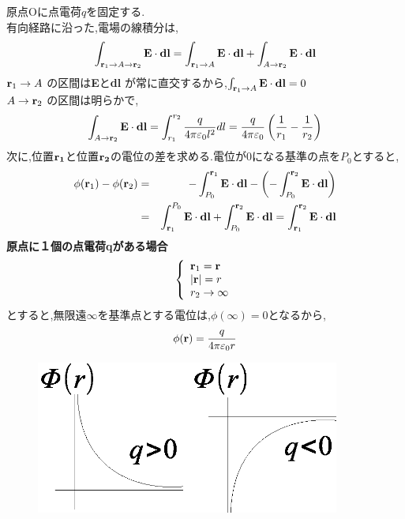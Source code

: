 \documentclass{jsarticle}
\begin{document}
原点Oに点電荷$q$を固定する. \\
有向経路に沿った,電場の線積分は,
\begin{eqnarray}
\int_{{\bf r}_1 \to A \to {\bf r}_2}^{} {\bf E} \cdot {\bf dl} = \int_{{\bf r}_1 \to A}^{} {\bf E} \cdot {\bf dl} + \int_{A \to {\bf r}_2}^{} {\bf E} \cdot {\bf dl}
\end{eqnarray}
${\bf r}_1 \to A$ の区間は{\bf E}と{\bf dl} が常に直交するから,$\int_{{\bf r}_1 \to A}^{} {\bf E} \cdot {\bf dl} = 0$ \\
$A \to {\bf r}_2$ の区間は明らかで,
\begin{eqnarray}
\int_{A \to {\bf r}_2}^{} {\bf E} \cdot {\bf dl} = \int_{r_1}^{r_2} \frac{q}{4 \pi \varepsilon_0 l^2} dl = \frac{q}{4 \pi \varepsilon_0} \left( \frac{1}{r_1}-\frac{1}{r_2} \right)
\end{eqnarray}
次に,位置${\bf r_1}$と位置${\bf r_2}$の電位の差を求める.電位が0になる基準の点を$P_0$とすると,
\begin{eqnarray}
 \phi ({\bf r}_1) - \phi ({\bf r}_2) &=& - \int_{P_0}^{{\bf r}_1} {\bf E} \cdot {\bf dl} - \left( -\int_{P_0}^{{\bf r}_2} {\bf E} \cdot {\bf dl} \right) \\
&=& \int_{{\bf r}_1}^{P_0} {\bf E} \cdot {\bf dl} + \int_{P_0}^{{\bf r}_2} {\bf E} \cdot {\bf dl} 
= \int_{{\bf r}_1}^{{\bf r}_2} {\bf E} \cdot {\bf dl} 
\end{eqnarray}
{\bf 原点に１個の点電荷qがある場合} \\
\begin{eqnarray}
\left \{
\begin{array}{l}
{\bf r}_1 = {\bf r} \\
|{\bf r}|=r \\
r_2 \to \infty 
\end{array}
\right.
\end{eqnarray}
とすると,無限遠$\infty$を基準点とする電位は,$\phi(\infty)=0$となるから,
\begin{eqnarray}
\phi ({\bf r}) = \frac{q}{4 \pi \varepsilon_0 r}
\end{eqnarray}
\begin{figure}[htbp]
 \begin{center}
  \includegraphics[width=100mm]{5.6.eps}
 \end{center}
 \caption{}
 \label{fig:six}
\end{figure}
\end{document}
